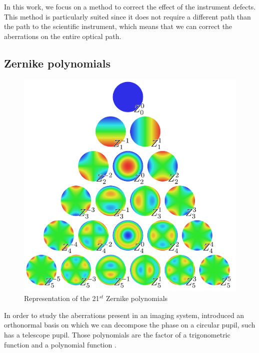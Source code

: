 In this work, we focus on a method to correct the effect of the instrument defects. This method is particularly suited since it does not require a different path than the path to the scientific instrument, which means that we can correct the aberrations on the entire optical path.

\subsection{Zernike polynomials}
\label{subsec:ZernikePol}

\begin{figure}
\begin{center}
\includegraphics[width=\textwidth,angle=0]{Figures/Zernike_polynomials}
\decoRule
\caption[Representation of the 21$^{st}$ Zernike polynomials]{Representation of the 21$^{st}$ Zernike polynomials \citep{ZernikeWiki}}
\label{fig:Zernike_polynomials}
\end{center}
\end{figure}


In order to study the aberrations present in an imaging system, \citet{zernike1934} introduced an orthonormal basis on which we can decompose the phase on a circular pupil, such has a telescope pupil. Those polynomials are the factor of a trigonometric function and a polynomial function \citep{Noll_1976}.

